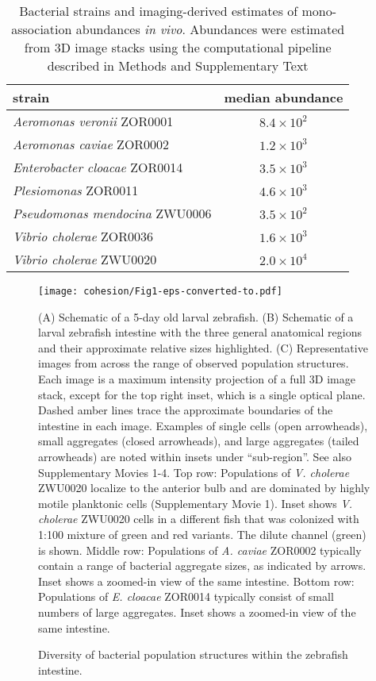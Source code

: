 \begin{table}
\centering
\begin{tabular}{l c }
\midrule
 strain               & median abundance     \\
\midrule
\textit{Aeromonas veronii} ZOR0001 &    $8.4 \times 10^2$                \\
\textit{Aeromonas caviae} ZOR0002 &   $1.2 \times 10^3$                  \\
\textit{Enterobacter cloacae} ZOR0014   &   $ 3.5 \times 10^3$            \\
\textit{Plesiomonas} ZOR0011      &  $ 4.6 \times 10^3 $      \\
\textit{Pseudomonas mendocina} ZWU0006         &   $3.5 \times 10^2$               \\
\textit{Vibrio cholerae} ZOR0036       &    $1.6 \times 10^3$                 \\
\textit{Vibrio cholerae} ZWU0020       &    $2.0 \times 10^4$                 \\
\midrule        
\end{tabular}\caption{Bacterial strains and imaging-derived estimates of mono-association abundances \textit{in vivo}.  Abundances were estimated from 3D image stacks using the computational pipeline described in Methods and Supplementary Text}
\end{table}

\begin{figure}%
	\centerline{
		\texttt{[image: cohesion/Fig1-eps-converted-to.pdf]}}
	\caption{Diversity of bacterial population structures within the zebrafish intestine.}{(A) Schematic of a 5-day old larval zebrafish. (B) Schematic of a larval zebrafish intestine with the three general anatomical regions and their approximate relative sizes highlighted. (C) Representative images from across the range of observed population structures. Each image is a maximum intensity projection of a full 3D image stack, except for the top right inset, which is a single optical plane. Dashed amber lines trace the approximate boundaries of the intestine in each image. Examples of single cells (open arrowheads), small aggregates (closed arrowheads), and large aggregates (tailed arrowheads) are noted within insets under ``sub-region''. See also Supplementary Movies 1-4.  Top row: Populations of \textit{V. cholerae} ZWU0020 localize to the anterior bulb and are dominated by highly motile planktonic cells (Supplementary Movie 1). Inset shows \textit{V. cholerae} ZWU0020 cells in a different fish that was colonized with 1:100 mixture of green and red variants. The dilute channel (green) is shown. Middle row: Populations of \textit{A. caviae} ZOR0002 typically contain a range of bacterial aggregate sizes, as indicated by arrows. Inset shows a zoomed-in view of the same intestine. Bottom row: Populations of \textit{E. cloacae} ZOR0014 typically consist of small numbers of large aggregates. Inset shows a zoomed-in view of the same intestine.}
\end{figure}

